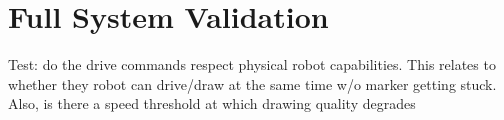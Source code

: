 
\section{Full System Validation}
\label{sec:system_validation}



Test: do the drive commands respect physical robot capabilities. This relates to whether they robot can drive/draw at the same time w/o marker getting stuck. Also, is there a speed threshold at which drawing quality degrades